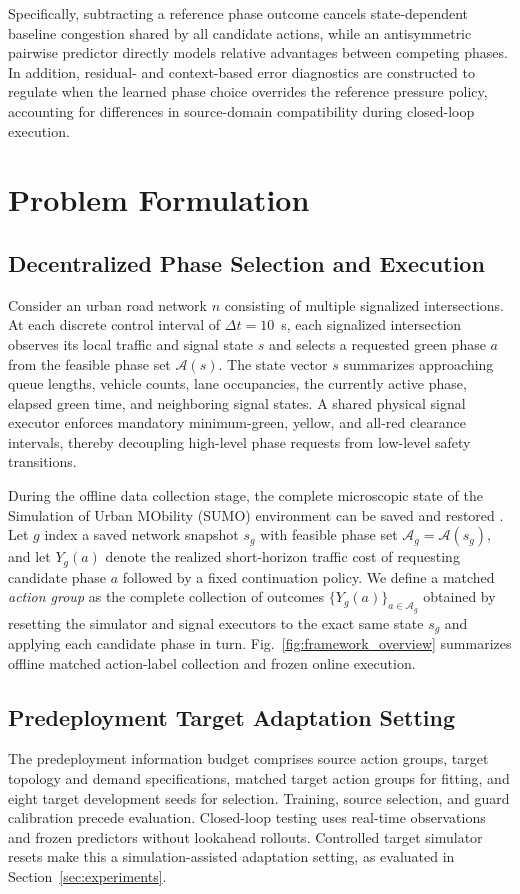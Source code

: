 \documentclass[letterpaper,journal]{IEEEtran}
\begin{document}
Specifically, subtracting a reference phase outcome cancels state-dependent baseline congestion shared by all candidate actions, while an antisymmetric pairwise predictor directly models relative advantages between competing phases. In addition, residual- and context-based error diagnostics are constructed to regulate when the learned phase choice overrides the reference pressure policy, accounting for differences in source-domain compatibility during closed-loop execution.

\section{Problem Formulation}
\label{sec:problem}
\subsection{Decentralized Phase Selection and Execution}
Consider an urban road network $n$ consisting of multiple signalized intersections. At each discrete control interval of $\Delta t = 10$~s, each signalized intersection observes its local traffic and signal state $s$ and selects a requested green phase $a$ from the feasible phase set $\mathcal A(s)$. The state vector $s$ summarizes approaching queue lengths, vehicle counts, lane occupancies, the currently active phase, elapsed green time, and neighboring signal states. A shared physical signal executor enforces mandatory minimum-green, yellow, and all-red clearance intervals, thereby decoupling high-level phase requests from low-level safety transitions.

During the offline data collection stage, the complete microscopic state of the Simulation of Urban MObility (SUMO) environment can be saved and restored \cite{lopez2018microscopic}. Let $g$ index a saved network snapshot $s_g$ with feasible phase set $\mathcal A_g=\mathcal A(s_g)$, and let $Y_g(a)$ denote the realized short-horizon traffic cost of requesting candidate phase $a$ followed by a fixed continuation policy. We define a matched \emph{action group} as the complete collection of outcomes $\{Y_g(a)\}_{a\in\mathcal A_g}$ obtained by resetting the simulator and signal executors to the exact same state $s_g$ and applying each candidate phase in turn. Fig.~\ref{fig:framework_overview} summarizes offline matched action-label collection and frozen online execution.

\subsection{Predeployment Target Adaptation Setting}
The predeployment information budget comprises source action groups, target topology and demand specifications, matched target action groups for fitting, and eight target development seeds for selection. Training, source selection, and guard calibration precede evaluation. Closed-loop testing uses real-time observations and frozen predictors without lookahead rollouts. Controlled target simulator resets make this a simulation-assisted adaptation setting, as evaluated in Section~\ref{sec:experiments}.
\end{document}

